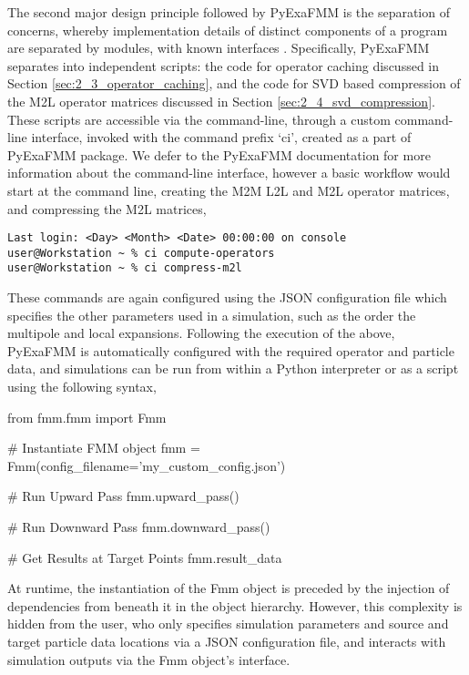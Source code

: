 The second major design principle followed by \gls{PyExaFMM} is
the separation of concerns, whereby implementation details of distinct
components of a program are separated by modules, with known interfaces
\cite{Gamma:1994:Addison}. Specifically, \gls{PyExaFMM} separates into independent
scripts: the code for operator caching discussed in Section \ref{sec:2_3_operator_caching},
and the code for SVD based compression of the M2L operator matrices discussed in
Section \ref{sec:2_4_svd_compression}. These scripts are accessible via the
command-line, through a custom command-line interface, invoked with the command
prefix `ci', created as a part of \gls{PyExaFMM} package. We defer to the \gls{PyExaFMM}
documentation for more information about the command-line interface, however a
basic workflow would start at the command line, creating the \gls{M2M}
\gls{L2L} and \gls{M2L} operator matrices, and compressing the \gls{M2L} matrices,

\begin{verbatim}
Last login: <Day> <Month> <Date> 00:00:00 on console
user@Workstation ~ % ci compute-operators
user@Workstation ~ % ci compress-m2l
\end{verbatim}

These commands are again configured using the \gls{JSON} configuration file
which specifies the other parameters used in a simulation, such as the order the
multipole and local expansions. Following the execution of the above,
\gls{PyExaFMM} is automatically configured with the required
operator and particle data, and simulations can be run from within a Python
interpreter or as a script using the following syntax,

\begin{python}
from fmm.fmm import Fmm

# Instantiate FMM object
fmm = Fmm(config_filename='my_custom_config.json')

# Run Upward Pass
fmm.upward_pass()

# Run Downward Pass
fmm.downward_pass()

# Get Results at Target Points
fmm.result_data
\end{python}

At runtime, the instantiation of the Fmm object is preceded by the injection of
dependencies from beneath it in the object hierarchy. However, this complexity is
hidden from the user, who only specifies simulation parameters and source
and target particle data locations via a \gls{JSON} configuration file, and interacts
with simulation outputs via the Fmm object's interface.

